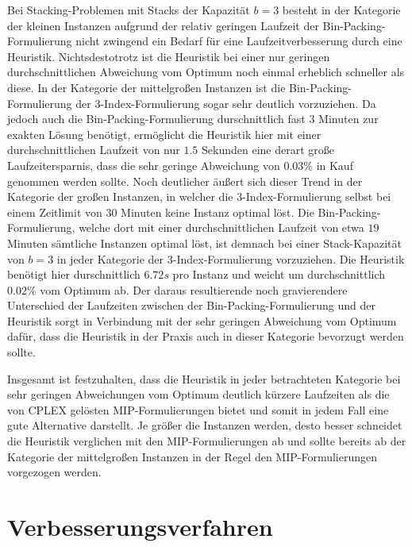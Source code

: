 Bei Stacking-Problemen mit Stacks der Kapazität $b = 3$ besteht in der Kategorie der kleinen Instanzen
aufgrund der relativ geringen Laufzeit der Bin-Packing-Formulierung nicht zwingend ein Bedarf für eine
Laufzeitverbesserung durch eine Heuristik. Nichtsdestotrotz ist die Heuristik bei einer nur geringen
durchschnittlichen Abweichung vom Optimum noch einmal erheblich schneller als diese.
In der Kategorie der mittelgroßen Instanzen ist die Bin-Packing-Formulierung der 3-Index-Formulierung sogar
sehr deutlich vorzuziehen. Da jedoch auch die Bin-Packing-Formulierung durschnittlich fast $3$ Minuten zur exakten Lösung benötigt, ermöglicht die Heuristik hier mit einer durchschnittlichen Laufzeit von nur $1.5$ Sekunden eine derart große Laufzeitersparnis, dass die sehr geringe Abweichung von $0.03 \%$ in Kauf genommen werden sollte.
Noch deutlicher äußert sich dieser Trend in der Kategorie der großen Instanzen, in welcher die 3-Index-Formulierung
selbst bei einem Zeitlimit von $30$ Minuten keine Instanz optimal löst. Die Bin-Packing-Formulierung, welche dort
mit einer durchschnittlichen Laufzeit von etwa $19$ Minuten sämtliche Instanzen optimal löst,
ist demnach bei einer Stack-Kapazität von $b = 3$ in jeder Kategorie der 3-Index-Formulierung vorzuziehen.
Die Heuristik benötigt hier durschnittlich $6.72s$ pro Instanz und weicht um durchschnittlich $0.02 \%$ vom Optimum ab.
Der daraus resultierende noch gravierendere Unterschied der Laufzeiten zwischen der Bin-Packing-Formulierung und
der Heuristik sorgt in Verbindung mit der sehr geringen Abweichung vom Optimum dafür, dass die Heuristik in der Praxis
auch in dieser Kategorie bevorzugt werden sollte.

\vfill
\pagebreak

Insgesamt ist festzuhalten, dass die Heuristik in jeder betrachteten Kategorie bei sehr geringen Abweichungen
vom Optimum deutlich kürzere Laufzeiten als die von \textsc{CPLEX} gelösten MIP-Formulierungen bietet und somit in
jedem Fall eine gute Alternative darstellt. Je größer die Instanzen werden, desto besser schneidet die Heuristik
verglichen mit den MIP-Formulierungen ab und sollte bereits ab der Kategorie der mittelgroßen Instanzen in der Regel
den MIP-Formulierungen vorgezogen werden.

\vfill
\pagebreak

\section{Verbesserungsverfahren}
\label{sec:post_optimization}

